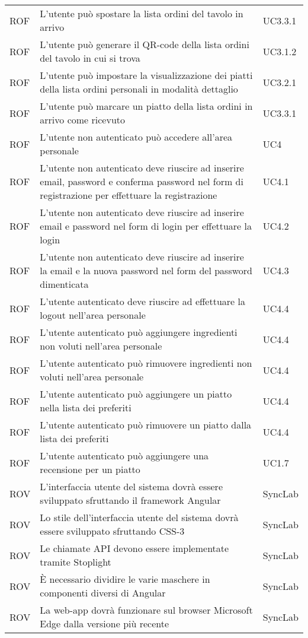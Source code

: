 \begin{center}
\begin{longtable}{ |p{1.5cm}|p{9cm}|p{1.5cm}|  }
        ROF&L'utente può spostare la lista ordini del tavolo in arrivo &UC3.3.1 \\
        ROF&L'utente può generare il QR-code della lista ordini del tavolo in cui si trova &UC3.1.2 \\
        ROF&L'utente può impostare la visualizzazione dei piatti della lista ordini personali in modalità dettaglio&UC3.2.1 \\
        ROF&L'utente può marcare un piatto della lista ordini in arrivo come ricevuto&UC3.3.1 \\
        ROF&L'utente non autenticato può accedere all'area personale&UC4\\
        ROF&L'utente non autenticato deve riuscire ad inserire email, password e conferma password nel form di registrazione per effettuare la registrazione &UC4.1\\
        ROF&L'utente non autenticato deve riuscire ad inserire email e password nel form di login per effettuare la login &UC4.2\\
        ROF&L'utente non autenticato deve riuscire ad inserire la email e la nuova password nel form del password dimenticata&UC4.3\\
        ROF&L'utente autenticato deve riuscire ad effettuare la logout nell'area personale&UC4.4\\
        ROF&L'utente autenticato può aggiungere ingredienti non voluti nell'area personale&UC4.4\\
        ROF&L'utente autenticato può rimuovere ingredienti non voluti nell'area personale&UC4.4\\
        ROF&L'utente autenticato può aggiungere un piatto nella lista dei preferiti&UC4.4\\
        ROF&L'utente autenticato può rimuovere un piatto dalla lista dei preferiti&UC4.4\\
        ROF&L'utente autenticato può aggiungere una recensione per un piatto&UC1.7\\
        ROV&L'interfaccia utente del sistema dovrà essere sviluppato sfruttando il framework Angular&SyncLab\\
        ROV&Lo stile dell'interfaccia utente del sistema dovrà essere sviluppato sfruttando CSS-3&SyncLab\\
        ROV&Le chiamate API devono essere implementate tramite Stoplight&SyncLab\\
        ROV&È necessario dividire le varie maschere in componenti diversi di Angular&SyncLab\\
        ROV&La web-app dovrà funzionare sul browser Microsoft Edge dalla versione più recente&SyncLab\\

\end{longtable}
\end{center}
